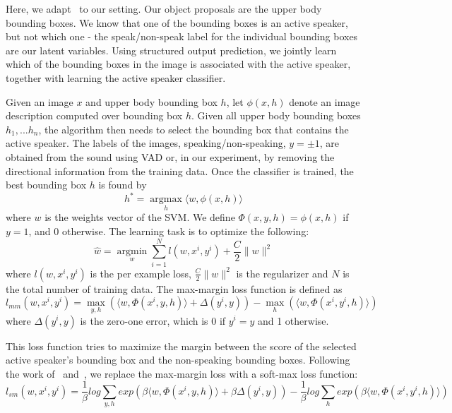 \documentclass[runningheads]{llncs}
\begin{document}
Here, we adapt~\cite{Bilen14a,Bilen14,Bilen15} to our setting. Our object proposals are the upper body bounding boxes. We know that one of the bounding boxes is an active speaker, but not which one - the speak/non-speak label for the individual bounding boxes are our latent variables. 
Using structured output prediction, we jointly learn which of the bounding boxes in the image is associated with the active speaker, together with learning the active speaker classifier.

Given an image $x$ and upper body bounding box $h$, let $\phi(x,h)$ denote an image description computed over bounding box $h$. 
Given all upper body bounding boxes $h_1,...h_n$, the algorithm then needs to select the bounding box that contains the active speaker.
The labels of the images, speaking/non-speaking, $y= \pm 1$, are obtained from the sound using VAD or, in our experiment, by removing the directional information from the training data.
Once the classifier is trained, the best bounding box $h$ is found by 
\begin{equation}
h^* = \underset{h}{\operatorname{argmax}}  \langle w,\phi(x,h) \rangle
\label{eq:bestBB}
\end{equation}
where $w$ is the weights vector of the SVM.
We define $\Phi(x,y,h) = \phi(x,h)$ if $y = 1$, and $0$ otherwise.
The learning task is to optimize the following:
\begin{equation}
\hat{w} = \underset{w}{\operatorname{argmin}} \sum_{i=1}^{N} l(w,x^i,y^i) + \frac{C}{2} \|w\| ^2
\end{equation}
where $l(w,x^i,y^i)$ is the per example loss, $\frac{C}{2} \|w\| ^2$ is the regularizer and $N$ is the total number of training data.
The max-margin loss function is defined as 
\begin{dmath}
l_{mm}(w,x^i,y^i) = \underset{y,h}{\operatorname{max}} ( \langle w,\Phi(x^i,y,h) \rangle +
\Delta(y^i,y)) - \underset{h}{\operatorname{max}} ( \langle w,\Phi(x^i,y^i,h) \rangle )
\end{dmath}
where $\Delta(y^i,y)$ is the zero-one error, which is $0$ if $y^i=y$ and 1 otherwise.

This loss function tries to maximize the margin between the score of the selected active speaker's bounding box and the non-speaking bounding boxes.
Following the work of~\cite{Bilen14} and~\cite{Bilen15}, we replace the max-margin loss with a soft-max loss function:
\begin{dmath}
l_{sm}(w,x^i,y^i) = \frac{1}{\beta} log \sum_{y,h} exp(\beta \langle w, \Phi(x^i,y,h) \rangle + \beta \Delta(y^i,y)) - \frac{1}{\beta} log \sum_{h} exp(\beta \langle w, \Phi(x^i,y^i,h) \rangle)
\end{dmath}
\end{document}
